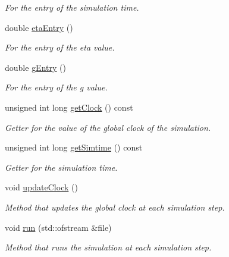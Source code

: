 \begin{DoxyCompactItemize}
\begin{DoxyCompactList}\small\item\em For the entry of the simulation time. \end{DoxyCompactList}\item 
double \hyperlink{classSimulation_ad94d39d7b80d43d7117735d7781095d4}{eta\-Entry} ()
\begin{DoxyCompactList}\small\item\em For the entry of the eta value. \end{DoxyCompactList}\item 
double \hyperlink{classSimulation_aa9c2c2460c65c62a00c594f5f621d71f}{g\-Entry} ()
\begin{DoxyCompactList}\small\item\em For the entry of the g value. \end{DoxyCompactList}\item 
unsigned int long \hyperlink{classSimulation_a91d1264242531776de72c355776b88e1}{get\-Clock} () const 
\begin{DoxyCompactList}\small\item\em Getter for the value of the global clock of the simulation. \end{DoxyCompactList}\item 
unsigned int long \hyperlink{classSimulation_ae9082b8c97c828540dd2f24618f5b55b}{get\-Simtime} () const 
\begin{DoxyCompactList}\small\item\em Getter for the simulation time. \end{DoxyCompactList}\item 
\hypertarget{classSimulation_a4ee55c77928e12594b3d175f7280f91f}{void \hyperlink{classSimulation_a4ee55c77928e12594b3d175f7280f91f}{update\-Clock} ()}\label{classSimulation_a4ee55c77928e12594b3d175f7280f91f}

\begin{DoxyCompactList}\small\item\em Method that updates the global clock at each simulation step. \end{DoxyCompactList}\item 
void \hyperlink{classSimulation_a92bcb99c5b442ef67d0229ae922a6240}{run} (std\-::ofstream \&file)
\begin{DoxyCompactList}\small\item\em Method that runs the simulation at each simulation step. \end{DoxyCompactList}\end{DoxyCompactItemize}


